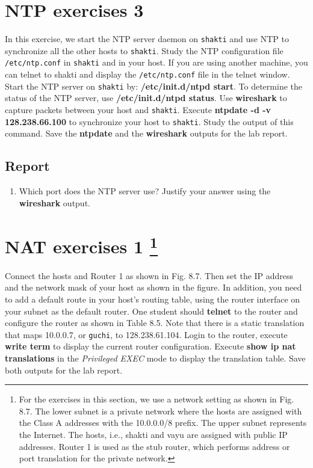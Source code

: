 \documentclass[10pt,a4paper]{article}
\numberwithin{equation}{section}
\numberwithin{figure}{section}
\numberwithin{table}{section}
\begin{document}
    \section*{NTP exercises 3}
    In this exercise, we start the NTP server daemon on \texttt{shakti} and use NTP to
    synchronize all the other hosts to \texttt{shakti}.
    Study the NTP configuration file \texttt{/etc/ntp.conf} in \texttt{shakti} and in your host.
    If you are using another machine, you can telnet to shakti and display the \texttt{/etc/ntp.conf} file in the telnet window.
    Start the NTP server on \texttt{shakti} by: \textbf{/etc/init.d/ntpd start}.
    To determine the status of the NTP server, use \textbf{/etc/init.d/ntpd status}.
    Use \textbf{wireshark} to capture packets between your host and \texttt{shakti}.
    Execute \textbf{ntpdate -d -v 128.238.66.100} to synchronize your host to \texttt{shakti}.
    Study the output of this command.
    Save the \textbf{ntpdate} and the \textbf{wireshark} outputs for the lab report.
    \subsection*{Report}
    \begin{enumerate}
        \item Which port does the NTP server use?
        Justify your answer using the \textbf{wireshark} output.
    \end{enumerate}

    \section*{NAT exercises 1 \footnote{For the exercises in this section, we use a network setting as shown in Fig. 8.7. The lower subnet is a private network where the hosts are assigned with the Class A addresses with the 10.0.0.0/8 prefix. The upper subnet represents the Internet. The hosts, i.e., shakti and vayu are assigned with public IP addresses. Router 1 is used as the stub router, which performs address or port translation for the private network.}}
    Connect the hosts and Router 1 as shown in Fig.
    8.7. Then set the IP address and the network mask of your host as shown in the figure.
    In addition, you need to add a default route in your host’s routing table, using the router interface on your subnet as the default router.
    One student should \textbf{telnet} to the router and configure the router as shown in Table 8.5. Note that there is a static translation that maps 10.0.0.7, or \texttt{guchi}, to 128.238.61.104.
    Login to the router, execute \textbf{write term} to display the current router configuration.
    Execute \textbf{show ip nat translations} in the \textit{Privileged EXEC} mode to display the translation table.
    Save both outputs for the lab report.
\end{document}
